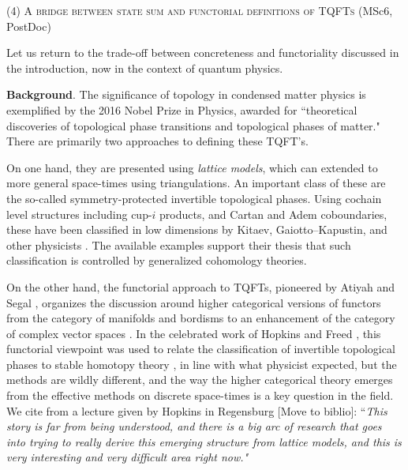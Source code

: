 
\smallskip
{\centering (4) \textsc{A bridge between state sum and functorial definitions of TQFTs} (MSc6, PostDoc)\par}

\smallskip Let us return to the trade-off between concreteness and functoriality discussed in the introduction, now in the context of quantum physics.



\smallskip\noindent\textbf{Background}.
The significance of topology in condensed matter physics is exemplified by the 2016 Nobel Prize in Physics, awarded for ``theoretical discoveries of topological phase transitions and topological phases of matter."
There are primarily two approaches to defining these TQFT's.

\quad On one hand, they are presented using \textit{lattice models}, which can extended to more general space-times using triangulations.
An important class of these are the so-called symmetry-protected invertible topological phases.
Using cochain level structures including cup-$i$ products, and Cartan and Adem coboundaries, these have been classified in low dimensions by Kitaev, Gaiotto--Kapustin, and other physicists \cite{kitaev2009periodic, kapustin2015cobordism, barkeshli2021classification}.
The available examples support their thesis that such classification is controlled by generalized cohomology theories.

\quad On the other hand, the functorial approach to TQFTs, pioneered by Atiyah and Segal \cite{atiyah1988tqft,segal1988conformal}, organizes the discussion around higher categorical versions of functors from the category of manifolds and bordisms to an enhancement of the category of complex vector spaces \cite{baez1995higher,lurie2008classification}.
In the celebrated work of Hopkins and Freed \cite{freed2021reflection}, this functorial viewpoint was used to relate the classification of invertible topological phases to stable homotopy theory \cite{freed2021reflection}, in line with what physicist expected, but the methods are wildly different, and the way the higher categorical theory emerges from the effective methods on discrete space-times is a key question in the field.
We cite from a lecture given by Hopkins in Regensburg [Move to biblio]:
``\textit{This story is far from being understood, and there is a big arc of research that goes into trying to really derive this emerging structure from lattice models, and this is very interesting and very difficult area right now."}

